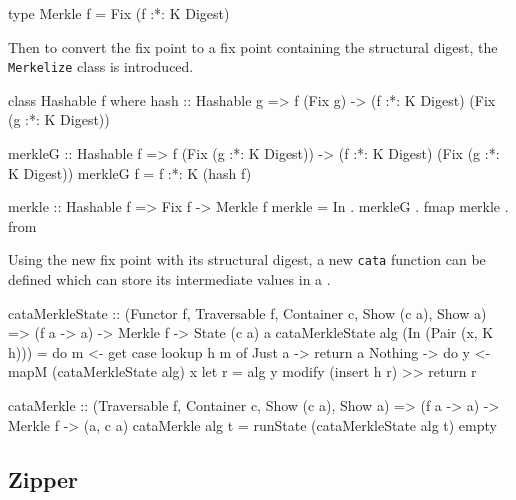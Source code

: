 \begin{haskell}
type Merkle f = Fix (f :*: K Digest)
\end{haskell}

Then to convert the fix point to a fix point containing the structural digest, the \texttt{Merkelize} class is introduced. 

\begin{haskell}
class Hashable f where
    hash :: Hashable g => f (Fix g) -> (f :*: K Digest) (Fix (g :*: K Digest))

merkleG :: Hashable f 
        => f (Fix (g :*: K Digest)) -> (f :*: K Digest) (Fix (g :*: K Digest))
merkleG f = f :*: K (hash f)

merkle :: Hashable f => Fix f -> Merkle f
merkle = In . merkleG . fmap merkle . from
\end{haskell}

Using the new fix point with its structural digest, a new \texttt{cata} function can be defined which can store its intermediate values in a . 

\begin{haskell}
cataMerkleState :: (Functor f, Traversable f, Container c, Show (c a), Show a)
                => (f a -> a) -> Merkle f -> State (c a) a
cataMerkleState alg (In (Pair (x, K h))) = do m <- get
  case lookup h m of
    Just a  -> return a
    Nothing -> do y <- mapM (cataMerkleState alg) x
               let r = alg y
               modify (insert h r) >> return r

cataMerkle :: (Traversable f, Container c, Show (c a), Show a)
           => (f a -> a) -> Merkle f -> (a, c a)
cataMerkle alg t = runState (cataMerkleState alg t) empty
\end{haskell}

\subsection{Zipper}
